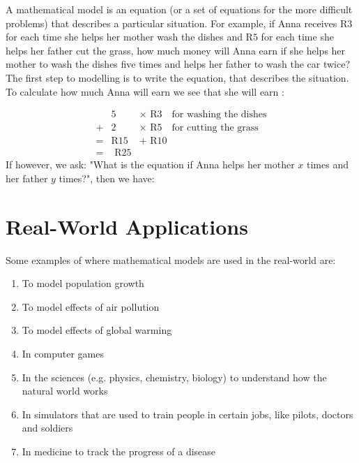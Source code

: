 A mathematical model is an equation (or a set of equations for the more difficult problems) that describes a particular situation.
For example, if Anna receives R$3$ for each time she helps her mother wash the dishes and R$5$ for each time she helps her father cut the grass, how much money will Anna earn if she helps her mother to wash the dishes five times and helps her father to wash the car twice?
The first step to modelling is to write the equation, that describes the situation. To calculate how much Anna will earn we see that she will earn :

\begin{eqnarray*}
&5 &\times \mbox{ R}3 \quad \mbox{for washing the dishes}\\
+&2 &\times \mbox{ R}5 \quad \mbox{for cutting the grass}\\
=& \mbox{R}15&+\mbox{ R}10\\
=& \mbox{ R}25
\end{eqnarray*}
If however, we ask: "What is the equation if Anna helps her mother $x$ times and her father $y$ times?", then we have:


\section{Real-World Applications}
Some examples of where mathematical models are used in the real-world are:

\begin{enumerate}
\item{To model population growth}
\item{To model effects of air pollution}
\item{To model effects of global warming}
\item{In computer games}
\item{In the sciences (e.g. physics, chemistry, biology) to understand how the natural world works}
\item{In simulators that are used to train people in certain jobs, like pilots, doctors and soldiers}
\item{In medicine to track the progress of a disease}
\end{enumerate}

